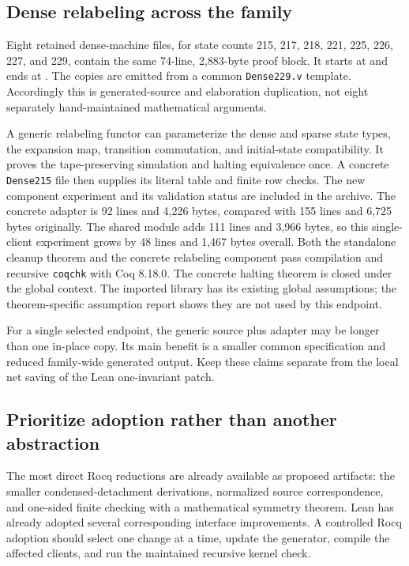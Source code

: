 \documentclass[11pt,letterpaper]{article}
\newcommand{\code}[1]{\texttt{#1}}
\begin{document}
\subsection{Dense relabeling across the family}

Eight retained dense-machine files, for state counts 215, 217, 218, 221, 225, 226,
227, and 229, contain the same 74-line, 2,883-byte proof block. It starts at
 and ends at .
The copies are emitted from a common \code{Dense229.v} template. Accordingly this
is generated-source and elaboration duplication, not eight separately hand-maintained
mathematical arguments.

A generic relabeling functor can parameterize the dense and sparse state types,
the expansion map, transition commutation, and initial-state compatibility. It proves
the tape-preserving simulation and halting equivalence once. A concrete
\code{Dense215} file then supplies its literal table and finite row checks.
The new component experiment and its validation status are included in the archive.
The concrete adapter is 92 lines and 4,226 bytes, compared with 155 lines and
6,725 bytes originally. The shared module adds 111 lines and 3,966 bytes, so this
single-client experiment grows by 48 lines and 1,467 bytes overall. Both the
standalone cleanup theorem and the concrete relabeling component pass compilation
and recursive \code{coqchk} with Coq 8.18.0. The concrete halting theorem is closed
under the global context. The imported library has its existing global assumptions;
the theorem-specific assumption report shows they are not used by this endpoint.

For a single selected endpoint, the generic source plus adapter may be longer than
one in-place copy. Its main benefit is a smaller common specification and reduced
family-wide generated output. Keep these claims separate from the local net saving
of the Lean one-invariant patch.

\subsection{Prioritize adoption rather than another abstraction}

The most direct Rocq reductions are already available as proposed artifacts:
the smaller condensed-detachment derivations, normalized source correspondence,
and one-sided finite checking with a mathematical symmetry theorem. Lean has already
adopted several corresponding interface improvements. A controlled Rocq adoption
should select one change at a time, update the generator, compile the affected
clients, and run the maintained recursive kernel check.
\end{document}

